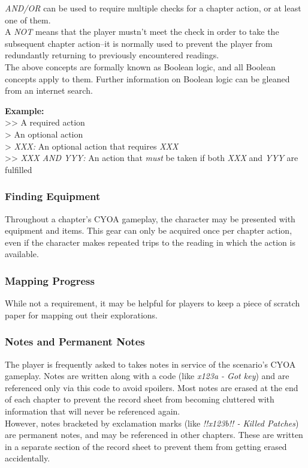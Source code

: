\documentclass[12pt]{article}
\begin{document}
\begin{multicols*}{2}
\emph{AND/OR} can be used to require multiple checks for a chapter action, or at least one of them.\\

A \emph{NOT} means that the player mustn’t meet the check in order to take the subsequent chapter action--it is normally used to prevent the player from redundantly returning to previously encountered readings.\\

The above concepts are formally known as Boolean logic, and all Boolean concepts apply to them. Further information on Boolean logic can be gleaned from an internet search.

\begin{tcolorbox}
\textbf{Example:}\\
>> A required action \\
> An optional action \\
> \emph{XXX:} An optional action that requires \emph{XXX}\\
>> \emph{XXX AND YYY:} An action that \emph{must} be taken if both \emph{XXX} and \emph{YYY} are fulfilled
\end{tcolorbox}

\subsubsection{Finding Equipment}
Throughout a chapter’s CYOA gameplay, the character may be presented with equipment and items. This gear can only be acquired once per chapter action, even if the character makes repeated trips to the reading in which the action is available. 

\subsubsection{Mapping Progress}
While not a requirement, it may be helpful for players to keep a piece of scratch paper for mapping out their explorations.

\subsubsection{Notes and Permanent Notes}
The player is frequently asked to takes notes in service of the scenario’s CYOA gameplay. Notes are written along with a code (like \emph{x123a - Got key}) and are referenced only via this code to avoid spoilers. Most notes are erased at the end of each chapter to prevent the record sheet from becoming cluttered with information that will never be referenced again.\\
However, notes bracketed by exclamation marks (like \emph{!!x123b!! - Killed Patches}) are permanent notes, and may be referenced in other chapters. These are written in a separate section of the record sheet to prevent them from getting erased accidentally.


\end{multicols*}
\end{document}
